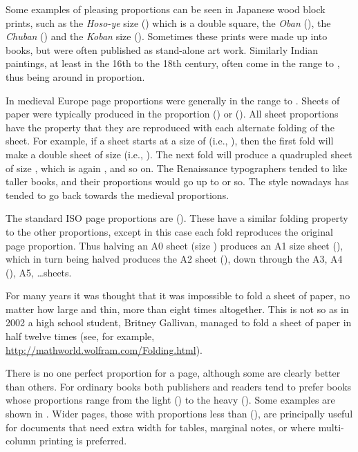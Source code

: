 \documentclass[10pt,a4paper,extrafontsizes]{memoir}
\begin{document}
\begin{paracol}{2}
\switchEng
    Some examples of pleasing proportions can be
seen in Japanese wood block prints, such as the \textit{Hoso-ye} size
() which is a double square, the \textit{Oban} (), %
the \textit{Chuban} () and the \textit{Koban} size
(). Sometimes these prints were made up into books, but
were often published as stand-alone art work. Similarly Indian paintings,
at least in the 16th to the 18th century,
often come in the range  to , thus being around
 in proportion.

    In medieval Europe page proportions were generally in the range
 to . Sheets of paper were typically 
produced in the
proportion  () or  
(). 
All sheet proportions
have the property that they are reproduced with each alternate
folding of the sheet.
For example, if a sheet starts at a size of  
(i.e., ),
then the first fold will make a double sheet of size 
(i.e., ). The next fold will produce a quadrupled sheet of size
, which is again , and so on. 
 The Renaissance typographers tended to like taller books, and their 
proportions would go up to 
or so. The style nowadays has tended to go back towards the medieval
proportions.

    The standard ISO page proportions are 
 (). These
have a similar folding property to the other proportions, except in this case
each fold reproduces the original page proportion.
Thus halving an A0 sheet 
(size ) produces an A1 size sheet (),
which in turn being halved produces the A2 sheet (), down
through the A3, A4 (), A5, \ldots sheets.

For many years it was thought that it was impossible to fold a sheet of 
paper, no matter how large and thin, more than eight times 
altogether. This is not so as in 2002 a high school student, Britney Gallivan,
managed to fold a sheet of paper in half twelve times (see, for example,
\url{http://mathworld.wolfram.com/Folding.html}).


   There is no one perfect proportion for a page, 
although some are clearly better
than others. For ordinary books both publishers and readers tend to prefer
books whose proportions range from the light 
 () to the heavy
 (). Some examples are shown in .
 Wider pages, those with proportions less than
 (),
are principally useful for documents that need
extra width for tables, marginal notes, 
or where multi-column printing is preferred. 
\end{paracol}
\end{document}
